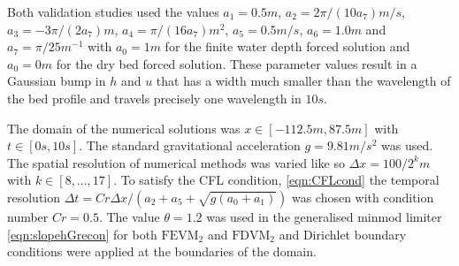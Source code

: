Both validation studies used the values $a_1 = 0.5m$, $a_2 = 2 \pi / \left(10 a_7\right) m/s$, $a_3 =- 3\pi/ \left(2 a_7\right)m$, $a_4 = \pi / (16 a_7) m^2$, $a_5 = 0.5 m/s$, $a_6 = 1.0 m$ and $a_7 = \pi / 25 m^{-1}$ with $a_0= 1m$ for the finite water depth forced solution and $a_0=0m$ for the dry bed forced solution. These parameter values result in a Gaussian bump in $h$ and $u$ that has a width much smaller than the wavelength of the bed profile and travels precisely one wavelength in $10s$.

The domain of the numerical solutions was $x \in \left[-112.5 m,87.5 m\right]$ with $t \in \left[0s,10s\right]$. The standard gravitational acceleration $g= 9.81 m/s^2$ was used. The spatial resolution of numerical methods was varied like so $\Delta x = 100 / 2^k m$ with $k \in \left[8,\dots,17\right]$. To satisfy the CFL condition, \eqref{eqn:CFLcond} the temporal resolution
$\Delta t = Cr \Delta x / \left(a_2 + a_5 + \sqrt{g\left(a_0 + a_1\right)}\right)$ was chosen with condition number $Cr = 0.5$. The value $\theta = 1.2$ was used in the generalised minmod limiter \eqref{eqn:slopehGrecon} for both $\text{FEVM}_2$ and $\text{FDVM}_2$ and Dirichlet boundary conditions were applied at the boundaries of the domain. 


